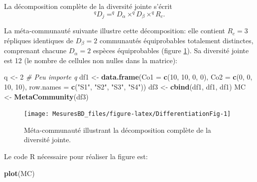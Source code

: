 \documentclass[
  11pt,
  french,
  a4paper,
  extrafontsizes,onecolumn,openright
  ]{memoir}
\newenvironment{Shaded}{\begin{snugshade}}{\end{snugshade}}
\newcommand{\CommentTok}[1]{\textcolor[rgb]{0.56,0.35,0.01}{\textit{#1}}}
\newcommand{\DataTypeTok}[1]{\textcolor[rgb]{0.13,0.29,0.53}{#1}}
\newcommand{\DecValTok}[1]{\textcolor[rgb]{0.00,0.00,0.81}{#1}}
\newcommand{\KeywordTok}[1]{\textcolor[rgb]{0.13,0.29,0.53}{\textbf{#1}}}
\newcommand{\NormalTok}[1]{#1}
\newcommand{\StringTok}[1]{\textcolor[rgb]{0.31,0.60,0.02}{#1}}
\begin{document}
La décomposition complète de la diversité jointe s'écrit
\begin{equation}
  \label{eq:DecJointe}
  ^{q}\!D_{j}= ^{q}\!D_{\alpha} \times ^{q}\!D_{\beta} \times ^{q}\!R_{c}.
\end{equation}

La méta-communauté suivante illustre cette décomposition: elle contient \(R_c=3\) répliques identiques de \(D_{\beta}=2\) communautés équiprobables totalement distinctes, comprenant chacune \(D_{\alpha}=2\) espèces équiprobables (figure \ref{fig:DifferentiationFig}).
Sa diversité jointe est 12 (le nombre de cellules non nulles dans la matrice):

\scriptsize

\begin{Shaded}
\begin{Highlighting}[]
\NormalTok{q <-}\StringTok{ }\DecValTok{2}  \CommentTok{# Peu importe q}
\NormalTok{df1 <-}\StringTok{ }\KeywordTok{data.frame}\NormalTok{(}\DataTypeTok{Co1 =} \KeywordTok{c}\NormalTok{(}\DecValTok{10}\NormalTok{, }\DecValTok{10}\NormalTok{, }\DecValTok{0}\NormalTok{, }\DecValTok{0}\NormalTok{), }\DataTypeTok{Co2 =} \KeywordTok{c}\NormalTok{(}\DecValTok{0}\NormalTok{, }\DecValTok{0}\NormalTok{, }\DecValTok{10}\NormalTok{, }\DecValTok{10}\NormalTok{), }
    \DataTypeTok{row.names =} \KeywordTok{c}\NormalTok{(}\StringTok{"S1"}\NormalTok{, }\StringTok{"S2"}\NormalTok{, }\StringTok{"S3"}\NormalTok{, }\StringTok{"S4"}\NormalTok{))}
\NormalTok{df3 <-}\StringTok{ }\KeywordTok{cbind}\NormalTok{(df1, df1, df1)}
\NormalTok{MC <-}\StringTok{ }\KeywordTok{MetaCommunity}\NormalTok{(df3)}
\end{Highlighting}
\end{Shaded}

\normalsize

\scriptsize

\begin{figure}

{\centering \texttt{[image: MesuresBD\_files/figure-latex/DifferentiationFig-1]} 

}

\caption{Méta-communauté illustrant la décomposition complète de la diversité jointe.}\label{fig:DifferentiationFig}
\end{figure}

\normalsize

Le code R nécessaire pour réaliser la figure est:

\scriptsize

\begin{Shaded}
\begin{Highlighting}[]
\KeywordTok{plot}\NormalTok{(MC)}
\end{Highlighting}
\end{Shaded}
\end{document}
